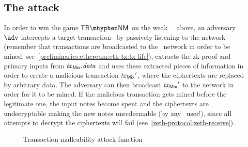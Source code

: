 \subsection{The attack}

In order to win the game $\trnm$ on the weak \zeth~\dapscheme~above, an adversary $\adv$ intercepts a target transaction \zethTx~by passively listening to the network (remember that transactions are broadcasted to the \ethereum~network in order to be mined, see~\cref{preliminaries:ethereum:eth-tx:tx-life}), extracts the zk-proof and primary inputs from $\mathit{\mathit{tx}_{\mathsf{Mix}}}.\mathit{data}$ and uses these extracted pieces of information in order to create a malicious transaction $\mathit{\mathit{tx}_{\mathsf{Mix}}}'$, where the ciphertexts are replaced by arbitrary data.
The adversary can then broadcast $\mathit{\mathit{tx}_{\mathsf{Mix}}}'$ to the network in order for it to be mined. If the malicious transaction gets mined before the legitimate one, the input notes become spent and the ciphertexts are undecryptable making the new notes unredeemable (by any \zeth~user!), since all attempts to decrypt the ciphertexts will fail (see~\cref{zeth-protocol:zeth-receive}).

\begin{figure}[H]
    \centering
    \caption{Transaction malleability attack function \txmalgen}\label{appendix:trnm:fig:txmalgen}
\end{figure}

